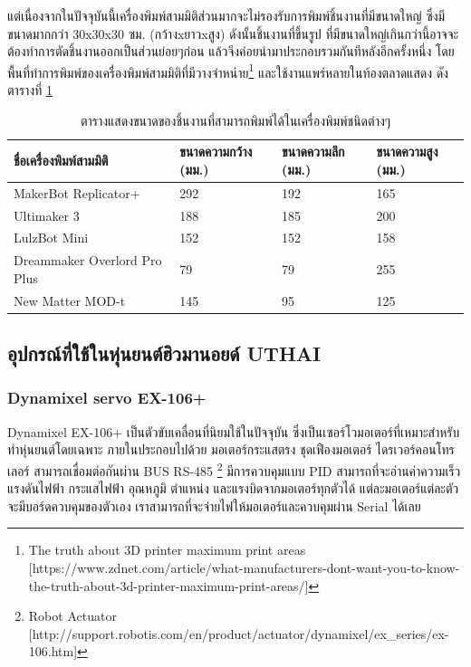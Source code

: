 แต่เนื่องจากในปัจจุบันนี้เครื่องพิมพ์สามมิติส่วนมากจะไม่รองรับการพิมพ์ชิ้นงานที่มีขนาดใหญ่ ซึ่งมีขนาดมากกว่า
30x30x30 ซม. (กว้างxยาวxสูง) ดังนั้นชิ้นงานที่ขึ้นรูป ที่มีขนาดใหญ่เกินกว่านี้อาจจะต้องทำการตัดชิ้นงานออกเป็นส่วนย่อยๆก่อน
แล้วจึงค่อยนำมาประกอบรวมกันทีหลังอีกครั้งหนึ่ง โดยพื้นที่ทำการพิมพ์ของเครื่องพิมพ์สามมิติที่มีวางจำหน่าย\footnote{The truth about 3D printer maximum print areas [https://www.zdnet.com/article/what-manufacturers-dont-want-you-to-know-the-truth-about-3d-printer-maximum-print-areas/]}
และใช้งานแพร่หลายในท้องตลาดแสดง ดังตารางที่ \ref{tab:3dprint_space} 
\begin{table}[!ht]
	\centering
	\begin{tabular}{| l | l | l | l |}
		\hline
		ชื่อเครื่องพิมพ์สามมิติ & ขนาดความกว้าง (มม.) & ขนาดความลึก (มม.) & ขนาดความสูง (มม.) \\
        \hline
        MakerBot Replicator+ & 292 & 192 & 165 \\
        Ultimaker 3 & 188 & 185 & 200 \\
        LulzBot Mini & 152 & 152 & 158 \\
        Dreammaker Overlord Pro Plus & 79 & 79 & 255 \\
        New Matter MOD-t & 145 & 95 & 125 \\
	    \hline
	\end{tabular}
	\caption{ตารางแสดงขนาดของชิ้นงานที่สามารถพิมพ์ได้ในเครื่องพิมพ์ชนิดต่างๆ}
	\label{tab:3dprint_space}
\end{table}





\clearpage
\subsection{อุปกรณ์ที่ใช้ในหุ่นยนต์ฮิวมานอยด์ UTHAI}

\subsubsection*{Dynamixel servo EX-106+}
Dynamixel EX-106+ เป็นตัวขับเคลื่อนที่นิยมใช้ในปัจจุบัน ซึ่งเป็นเซอร์โวมอเตอร์ที่เหมาะสำหรับทำหุ่นยนต์โดยเฉพาะ
ภายในประกอบไปด้วย มอเตอร์กระแสตรง ชุดเฟืองมอเตอร์ ไดรเวอร์คอนโทรเลอร์ สามารถเชื่อมต่อกันผ่าน BUS RS-485
\footnote{ Robot Actuator [http://support.robotis.com/en/product/actuator/dynamixel/ex\_series/ex-106.htm] }
มีการควบคุมแบบ PID สามารถที่จะอ่านค่าความเร็ว
แรงดันไฟฟ้า กระแสไฟฟ้า อุณหภูมิ ตำแหน่ง และแรงบิดจากมอเตอร์ทุกตัวได้ แต่ละมอเตอร์แต่ละตัวจะมีบอร์ดควบคุมของตัวเอง
เราสามารถที่จะจ่ายไฟให้มอเตอร์และควบคุมผ่าน Serial ได้เลย

